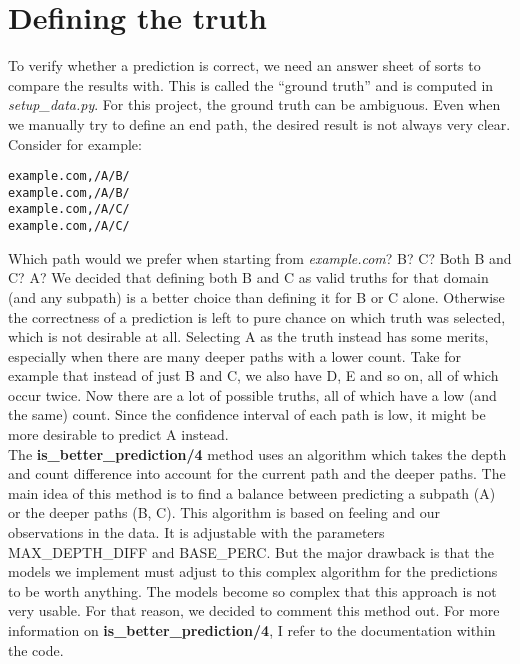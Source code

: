 \section{Defining the truth}\label{sec:truth}

To verify whether a prediction is correct, we need an answer sheet of sorts to compare the results with. This is called the ``ground truth'' and is computed in \textit{setup\_data.py}. For this project, the ground truth can be ambiguous. Even when we manually try to define an end path, the desired result is not always very clear. Consider for example:
\begin{lstlisting}
example.com,/A/B/
example.com,/A/B/
example.com,/A/C/
example.com,/A/C/
\end{lstlisting}
Which path would we prefer when starting from \textit{example.com}? B? C? Both B and C? A? We decided that defining both B and C as valid truths for that domain (and any subpath) is a better choice than defining it for B or C alone. Otherwise the correctness of a prediction is left to pure chance on which truth was selected, which is not desirable at all. Selecting A as the truth instead has some merits, especially when there are many deeper paths with a lower count. Take for example that instead of just B and C, we also have D, E and so on, all of which occur twice. Now there are a lot of possible truths, all of which have a low (and the same) count. Since the confidence interval of each path is low, it might be more desirable to predict A instead. 
\\[2ex]
The \textbf{is\_better\_prediction/4} method uses an algorithm which takes the depth and count difference into account for the current path and the deeper paths. The main idea of this method is to find a balance between predicting a subpath (A) or the deeper paths (B, C). This algorithm is based on feeling and our observations in the data. It is adjustable with the parameters MAX\_DEPTH\_DIFF and BASE\_PERC. But the major drawback is that the models we implement must adjust to this complex algorithm for the predictions to be worth anything. The models become so complex that this approach is not very usable. For that reason, we decided to comment this method out. For more information on \textbf{is\_better\_prediction/4}, I refer to the documentation within the code.
\\[2ex]
